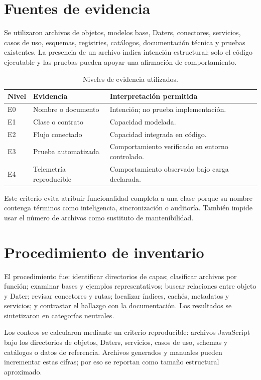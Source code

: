 \section{Fuentes de evidencia}

Se utilizaron archivos de objetos, modelos base, Daters, conectores, servicios, casos de
uso, esquemas, registries, catálogos, documentación técnica y pruebas existentes. La
presencia de un archivo indica intención estructural; solo el código ejecutable y las
pruebas pueden apoyar una afirmación de comportamiento.

\begin{table}[H]
\centering
\caption{Niveles de evidencia utilizados.}
\label{tab:niveles-evidencia-implementacion}
\begin{tabularx}{\textwidth}{p{2cm}p{4cm}X}
\toprule
Nivel & Evidencia & Interpretación permitida \\
\midrule
E0 & Nombre o documento & Intención; no prueba implementación.\\
E1 & Clase o contrato & Capacidad modelada.\\
E2 & Flujo conectado & Capacidad integrada en código.\\
E3 & Prueba automatizada & Comportamiento verificado en entorno controlado.\\
E4 & Telemetría reproducible & Comportamiento observado bajo carga declarada.\\
\bottomrule
\end{tabularx}
\end{table}

Este criterio evita atribuir funcionalidad completa a una clase porque su nombre
contenga términos como inteligencia, sincronización o auditoría. También impide usar el
número de archivos como sustituto de mantenibilidad.

\section{Procedimiento de inventario}

El procedimiento fue: identificar directorios de capas; clasificar archivos por función;
examinar bases y ejemplos representativos; buscar relaciones entre objeto y Dater;
revisar conectores y rutas; localizar índices, cachés, metadatos y servicios; y contrastar
el hallazgo con la documentación. Los resultados se sintetizaron en categorías neutrales.

Los conteos se calcularon mediante un criterio reproducible: archivos JavaScript bajo
los directorios de objetos, Daters, servicios, casos de uso, schemas y catálogos o datos
de referencia. Archivos generados y manuales pueden incrementar estas cifras; por eso se
reportan como tamaño estructural aproximado.

